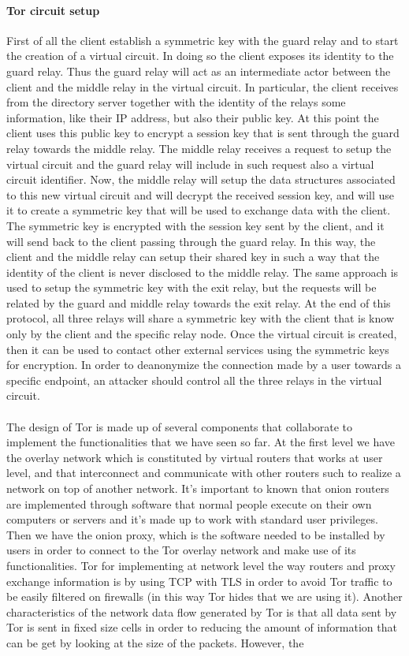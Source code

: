 \paragraph{Tor circuit setup} First of all the client establish a symmetric key with the guard relay and to start the creation of a virtual circuit. In doing so the client exposes its identity to the guard relay. Thus the guard relay will act as an intermediate actor between the client and the middle relay in the virtual circuit. In particular, the client receives from the directory server together with the identity of the relays some information, like their IP address, but also their public key. At this point the client uses this public key to encrypt a session key that is sent through the guard relay towards the middle relay. The middle relay receives a request to setup the virtual circuit and the guard relay will include in such request also a virtual circuit identifier. Now, the middle relay will setup the data structures associated to this new virtual circuit and will decrypt the received session key, and will use it to create a symmetric key that will be used to exchange data with the client. The symmetric key is encrypted with the session key sent by the client, and it will send back to the client passing through the guard relay. In this way, the client and the middle relay can setup their shared key in such a way that the identity of the client is never disclosed to the middle relay. The same approach is used to setup the symmetric key with the exit relay, but the requests will be related by the guard and middle relay towards the exit relay. At the end of this protocol, all three relays will share a symmetric key with the client that is know only  by the client and the specific relay node. Once the virtual circuit is created, then it can be used to contact other external services using the symmetric keys for encryption. In order to deanonymize the connection made by a user towards a specific endpoint, an attacker should control all the three relays in the virtual circuit.\\\\The design of Tor is made up of several components that collaborate to implement the functionalities that we have seen so far. At the first level we have the overlay network which is constituted by virtual routers that works at user level, and that interconnect and communicate with other routers such to realize a network on top of another network. It's important to known that onion routers are implemented through software that normal people execute on their own computers or servers and it's made up to work with standard user privileges. Then we have the onion proxy, which is the software needed to be installed by users in order to connect to the Tor overlay network and make use of its functionalities. Tor for implementing at network level the way routers and proxy exchange information is by using TCP with TLS in order to avoid Tor traffic to be easily filtered on firewalls (in this way Tor hides that we are using it). Another characteristics of the network data flow generated by Tor is that all data sent by Tor is sent in fixed size cells in order to reducing the amount of information that can be get by looking at the size of the packets. However, the 
